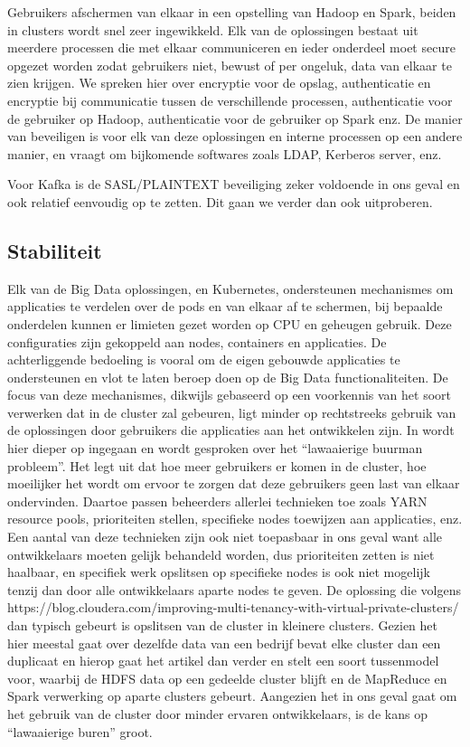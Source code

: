 Gebruikers afschermen van elkaar in een opstelling van Hadoop en Spark, beiden in clusters wordt snel zeer ingewikkeld. Elk van de oplossingen bestaat uit meerdere processen die met elkaar communiceren en ieder onderdeel moet secure opgezet worden zodat gebruikers niet, bewust of per ongeluk, data van elkaar te zien krijgen. We spreken hier over encryptie voor de opslag, authenticatie en encryptie bij communicatie tussen de verschillende processen, authenticatie voor de gebruiker op Hadoop, authenticatie voor de gebruiker op Spark enz.
De manier van beveiligen is voor elk van deze oplossingen en interne processen op een andere manier, en vraagt om bijkomende softwares zoals LDAP, Kerberos server, enz.

Voor Kafka is de SASL/PLAINTEXT beveiliging zeker voldoende in ons geval en ook relatief eenvoudig op te zetten. Dit gaan we verder dan ook uitproberen.

\subsection{Stabiliteit}
Elk van de Big Data oplossingen, en Kubernetes, ondersteunen mechanismes om applicaties te verdelen over de pods en van elkaar af te schermen, bij bepaalde onderdelen kunnen er limieten gezet worden op CPU en geheugen gebruik. Deze configuraties zijn gekoppeld aan nodes, containers en applicaties. De achterliggende bedoeling is vooral om de eigen gebouwde applicaties te ondersteunen en vlot te laten beroep doen op de Big Data functionaliteiten. De focus van deze mechanismes, dikwijls gebaseerd op een voorkennis van het soort verwerken dat in de cluster zal gebeuren, ligt minder op rechtstreeks gebruik van de oplossingen door gebruikers die applicaties aan het ontwikkelen zijn.
\newline
\newline
In \textcite{Deane2019} wordt hier dieper op ingegaan en wordt gesproken over het ``lawaaierige buurman probleem''. Het legt uit dat hoe meer gebruikers er komen in de cluster, hoe moeilijker het wordt om ervoor te zorgen dat deze gebruikers geen last van elkaar ondervinden. Daartoe passen beheerders allerlei technieken toe zoals YARN resource pools, prioriteiten stellen, specifieke nodes toewijzen aan applicaties, enz. Een aantal van deze technieken zijn ook niet toepasbaar in ons geval want alle ontwikkelaars moeten gelijk behandeld worden, dus prioriteiten zetten is niet haalbaar, en specifiek werk opslitsen op specifieke nodes is ook niet mogelijk tenzij dan door alle ontwikkelaars aparte nodes te geven.
De oplossing die volgens https://blog.cloudera.com/improving-multi-tenancy-with-virtual-private-clusters/ dan typisch gebeurt is opslitsen van de cluster in kleinere clusters. Gezien het hier meestal gaat over dezelfde data van een bedrijf bevat elke cluster dan een duplicaat en hierop gaat het artikel dan verder en stelt een soort tussenmodel voor, waarbij de HDFS data op een gedeelde cluster blijft en de MapReduce en Spark verwerking op aparte clusters gebeurt.
\newline
Aangezien het in ons geval gaat om het gebruik van de cluster door minder ervaren ontwikkelaars, is de kans op ``lawaaierige buren'' groot.


